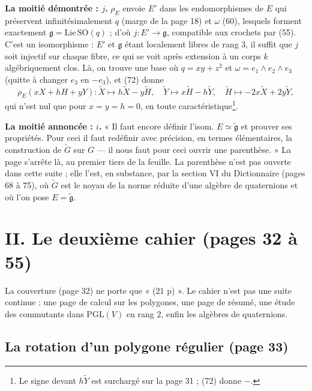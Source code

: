 \documentclass[11pt,a4paper]{article}
\begin{document}
\textbf{La moitié démontrée : $j$.} $\rho_E$ envoie $E'$ dans les endomorphismes de
$E$ qui préservent infinitésimalement $q$ (marge de la page 18) et $\omega$ (60),
lesquels forment exactement $\mathfrak{g} = \mathrm{Lie}\, \mathrm{SO}(q)$ ; d'où
$j : E' \to \mathfrak{g}$, compatible aux crochets par (55). C'est un isomorphisme :
$E'$ et $\mathfrak{g}$ étant localement libres de rang $3$, il suffit que $j$ soit
injectif sur chaque fibre, ce qui se voit après extension à un corps $k$
algébriquement clos. Là, on trouve une base où $q = xy + z^2$ et
$\omega = e_1 \wedge e_2 \wedge e_3$ (quitte à changer $e_3$ en $-e_3$), et (72) donne
\[
  \rho_E(xX + hH + yY) :
  \widetilde{X} \mapsto h\widetilde{X} - y\widetilde{H} , \quad
  \widetilde{Y} \mapsto x\widetilde{H} - h\widetilde{Y} , \quad
  \widetilde{H} \mapsto -2x\widetilde{X} + 2y\widetilde{Y} ,
\]
qui n'est nul que pour $x = y = h = 0$, en toute caractéristique\footnote{Le signe
devant $h\widetilde{Y}$ est surchargé sur la page 31 ; (72) donne $-$.}.

\textbf{La moitié annoncée : $i$.} « Il faut encore définir l'isom.
$E \simeq \widetilde{\mathfrak{g}}$ et prouver ses propriétés. Pour ceci il faut
redéfinir avec précision, en termes élémentaires, la construction de $\widetilde{G}$
sur $G$ — il nous faut pour ceci ouvrir une parenthèse. » La page s'arrête là, au
premier tiers de la feuille. La parenthèse n'est pas ouverte dans cette suite ;
elle l'est, en substance, par la section VI du Dictionnaire (pages 68 à 75), où
$\widetilde{G}$ est le noyau de la norme réduite d'une algèbre de quaternions et
où l'on pose $E = \widetilde{\mathfrak{g}}$.

\section*{II. Le deuxième cahier (pages 32 à 55)}

La couverture (page 32) ne porte que « (21 p) ». Le cahier n'est pas une suite
continue : une page de calcul sur les polygones, une page de résumé, une étude
des commutants dans $\mathrm{PGL}(V)$ en rang $2$, enfin les algèbres de quaternions.

\subsection*{La rotation d'un polygone régulier (page 33)}
\end{document}

